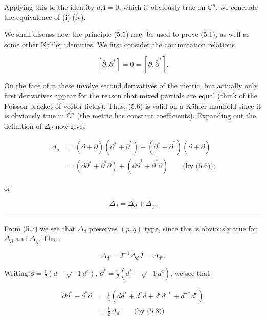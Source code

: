 \documentclass[
  english,
  a3paper,
  a3paper]{extarticle}
\begin{document}
Applying this to the identity \(dA=0\), which is obviously true on
\(\mathbb C^n\), we conclude the equivalence of (i)-(iv).

We shall discuss how the principle (5.5) may be used to prove (5.1), as
well as some other Kähler identities. We first consider the commutation
relations

\[\tag{5.6}[\bar\partial,\partial^*]=0=[\partial,\bar\partial^*].\]

On the face of it these involve second derivatives of the metric, but
actually only first derivatives appear for the reason that mixed
partials are equal (think of the Poisson bracket of vector fields).
Thus, (5.6) is valid on a Kähler manifold since it is obviously true in
\(\mathbb C^n\) (the metric has constant coefficients). Expanding out
the definition of \(\Delta_d\) now gives

\[\begin{aligned}\Delta_d&=(\partial+\bar\partial)(\partial^*+\bar\partial^*)+(\partial^*+\bar\partial^*)(\partial+\bar\partial)\\&=(\partial\partial^*+\partial^*\partial)+(\bar\partial\bar\partial^*+\bar\partial^*\bar\partial)\qquad\text{(by (5.6));}\end{aligned}\]

or

\[\tag{5.7}\Delta_d=\Delta_\partial+\Delta_{\bar\partial}.\]

\clearpage



\par

\vspace{0.7mm}\hrule\vspace{1.6mm}

\fontsize{9}{11}\selectfont

From (5.7) we see that \(\Delta_d\) preserves \((p,q)\) type, since this
is obviously true for \(\Delta_\partial\) and \(\Delta_{\bar\partial}\).
Thus

\[\tag{5.8}\Delta_d=J^{-1}\Delta_dJ=\Delta_{d^c}.\]

Writing \(\partial=\frac12(d-\sqrt{-1}d^c)\),
\(\partial^*=\frac12(d^*-\sqrt{-1}d^c)\), we see that

\[\begin{aligned}\partial\partial^*+\partial^*\partial&=\frac14(dd^*+d^*d+d^cd^{c*}+d^{c*}d^c)\\&=\frac12\Delta_d\qquad\text{(by (5.8))}\end{aligned}\]
\end{document}
